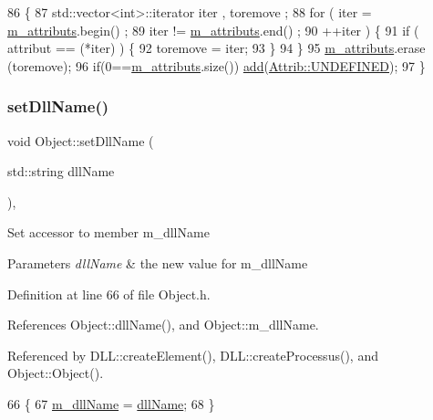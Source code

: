 \begin{DoxyCode}
86                                \{
87     std::vector<int>::iterator iter , toremove ;
88     \textcolor{keywordflow}{for} ( iter  = \hyperlink{classAttrib_ac4bd58a0cc6b38a3b711d609a3d3aacc}{m\_attributs}.begin() ;
89           iter != \hyperlink{classAttrib_ac4bd58a0cc6b38a3b711d609a3d3aacc}{m\_attributs}.end()   ;
90           ++iter ) \{
91       \textcolor{keywordflow}{if} ( attribut == (*iter) ) \{
92         toremove = iter;
93       \}
94     \}
95     \hyperlink{classAttrib_ac4bd58a0cc6b38a3b711d609a3d3aacc}{m\_attributs}.erase (toremove);
96     \textcolor{keywordflow}{if}(0==\hyperlink{classAttrib_ac4bd58a0cc6b38a3b711d609a3d3aacc}{m\_attributs}.size()) \hyperlink{classAttrib_a235f773af19c900264a190b00a3b4ad7}{add}(\hyperlink{classAttrib_a69e171d7cc6417835a5a306d3c764235a3a8da2ab97dda18aebab196fe4100531}{Attrib::UNDEFINED});
97   \}
\end{DoxyCode}
\mbox{\label{classObject_a870c5af919958c2136623b2d7816d123}} 
\subsubsection{\texorpdfstring{set\+Dll\+Name()}{setDllName()}}
{\footnotesize\ttfamily void Object\+::set\+Dll\+Name (\begin{DoxyParamCaption}\item[{std\+::string}]{dll\+Name }\end{DoxyParamCaption})\hspace{0.3cm}{\ttfamily [inline]}, {\ttfamily [inherited]}}

Set accessor to member m\+\_\+dll\+Name 
\begin{DoxyParams}{Parameters}
{\em dll\+Name} & the new value for m\+\_\+dll\+Name \\
\hline
\end{DoxyParams}


Definition at line 66 of file Object.\+h.



References Object\+::dll\+Name(), and Object\+::m\+\_\+dll\+Name.



Referenced by D\+L\+L\+::create\+Element(), D\+L\+L\+::create\+Processus(), and Object\+::\+Object().


\begin{DoxyCode}
66                                       \{
67     \hyperlink{classObject_a01afbeacebb8db6831559972ec362eb3}{m\_dllName} = \hyperlink{classObject_a2e3947f2870094c332d7454117f3ec63}{dllName};
68   \}
\end{DoxyCode}
\mbox{\label{classObject_a398fe08cba594a0ce6891d59fe4f159f}} 
